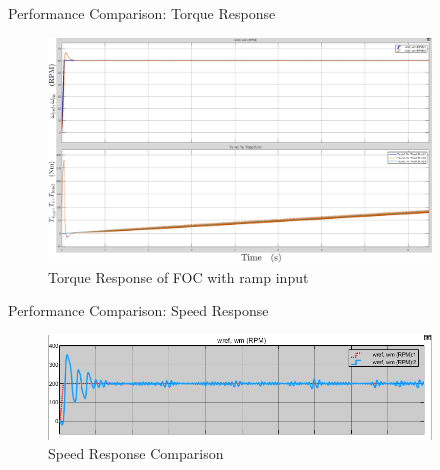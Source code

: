 \documentclass{beamer}
\begin{document}
\begin{frame}{Performance Comparison: Torque Response}
  \begin{figure}
    \includegraphics[width=4in]{conference/foc_60rpm.png} %
    \caption{Torque Response of FOC with ramp input}
  \end{figure}
\end{frame}

\begin{frame}{Performance Comparison: Speed Response}
    \begin{figure}
      \includegraphics[width=4in]{conference/Speed_conf.png} %
      \caption{Speed Response Comparison}
    \end{figure}
  \end{frame}
  
\end{document}
